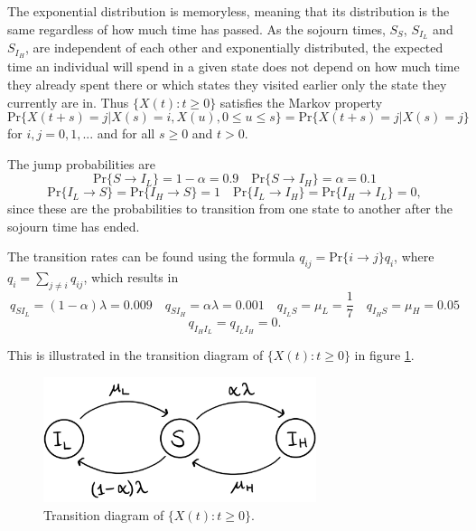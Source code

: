 The exponential distribution is memoryless, meaning that its distribution is the same regardless of how much time has passed. As the sojourn times, $S_S$, $S_{I_L}$ and $S_{I_H}$, are independent of each other and exponentially distributed, the expected time an individual will spend in a given state does not depend on how much time they already spent there or which states they visited earlier only the state they currently are in. Thus $\{X(t):t \geq 0 \}$  satisfies the Markov property
$$\text{Pr}\{X(t+s)=j|X(s)=i, X(u), 0 \leq u \leq s\}=\text{Pr}\{X(t+s)=j|X(s)=j\}$$ 
for $i,j = 0,1,...$ and for all $s \geq 0$ and $t >0 $.


The jump probabilities are 
$$\text{Pr}\{S \rightarrow I_L\}= 1 - \alpha = 0.9 \quad \text{Pr}\{S \rightarrow I_H\}= \alpha = 0.1$$ 
$$\text{Pr}\{I_L \rightarrow S\}= \text{Pr}\{I_H \rightarrow S\} = 1 \quad \text{Pr}\{I_L \rightarrow I_H\}= \text{Pr}\{I_H \rightarrow I_L\} = 0,$$ 
since these are the probabilities to transition from one state to another after the sojourn time has ended.


The transition rates can be found using the formula $q_{ij} = \text{Pr}\{i \rightarrow j \} q_i$, where $q_i = \sum_{j \neq i} q_{ij}$, which results in
$$q_{SI_L} = (1-\alpha)\lambda = 0.009 \quad q_{SI_H} = \alpha \lambda = 0.001 \quad q_{I_LS} = \mu_L = \frac17  \quad q_{I_HS} = \mu_H = 0.05 $$
$$ q_{I_HI_L}=q_{I_LI_H}=0. $$

This is illustrated in the transition diagram of $\{X(t):t \geq 0 \}$ in figure \ref{transdiagramA}.

\begin{figure}
    \centering
    \includegraphics[width=80mm]{TransDiag1A.png}
    \caption{Transition diagram of $\{X(t):t\geq0\}$.}
    \label{transdiagramA}
\end{figure}




